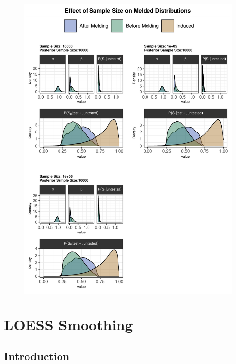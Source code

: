 \documentclass[12pt,twoside]{smiththesis}
\begin{document}
\begin{figure}

{\centering \includegraphics[width=1\linewidth]{thesis_files/figure-latex/unnamed-chunk-29-1} 

}

\caption{\label{fig:trunc}}\label{fig:unnamed-chunk-29}
\end{figure}
\newpage

\hypertarget{loess-smoothing}{%
\section{LOESS Smoothing}\label{loess-smoothing}}

\hypertarget{introduction-1}{%
\subsection{Introduction}\label{introduction-1}}
\end{document}

